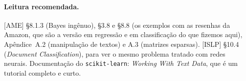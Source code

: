 \documentclass[11pt,a4paper]{article}
\begin{document}
\paragraph{Leitura recomendada.} [AME] §8.1.3 (Bayes ingênuo), §3.8 e §8.8 (os
exemplos com as resenhas da Amazon, que são a versão em regressão e em classificação
do que fizemos aqui), Apêndice~A.2 (manipulação de textos) e A.3 (matrizes
esparsas). [ISLP] §10.4 (\emph{Document Classification}), para ver o mesmo problema
tratado com redes neurais. Documentação do \texttt{scikit-learn}: \emph{Working With
Text Data}, que é um tutorial completo e curto.
\end{document}
